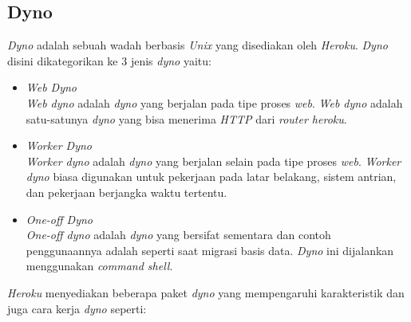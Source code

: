 \subsection{Dyno}
\textit{Dyno} adalah sebuah wadah berbasis \textit{Unix} yang disediakan oleh \textit{Heroku}. \textit{Dyno} disini dikategorikan ke 3 jenis \textit{dyno} yaitu:
\begin{itemize}
    \item \textit{Web Dyno} \\ 
    \textit{Web dyno} adalah \textit{dyno} yang berjalan pada tipe proses \textit{web}. \textit{Web dyno} adalah satu-satunya \textit{dyno} yang bisa menerima \textit{HTTP} dari \textit{router heroku}. 
    \item \textit{Worker Dyno} \\ 
    \textit{Worker dyno} adalah \textit{dyno} yang berjalan selain pada tipe proses \textit{web}. \textit{Worker dyno} biasa digunakan untuk pekerjaan pada latar belakang, sistem antrian, dan pekerjaan berjangka waktu tertentu. 
    \item \textit{One-off Dyno} \\ 
    \textit{One-off dyno} adalah \textit{dyno} yang bersifat sementara dan contoh penggunaannya adalah seperti saat migrasi basis data. \textit{Dyno} ini dijalankan menggunakan \textit{command shell}. 
\end{itemize}
\textit{Heroku} menyediakan beberapa paket \textit{dyno} yang mempengaruhi karakteristik dan juga cara kerja \textit{dyno} seperti:
